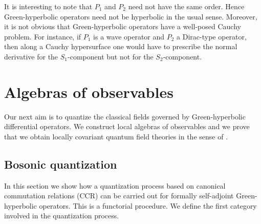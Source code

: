 \documentclass[a4paper,11pt]{amsart}
\theoremstyle{definition}
\begin{document}
It is interesting to note that $P_1$ and $P_2$ need not have the same order.
Hence Green-hyperbolic operators need not be hyperbolic in the usual sense.
Moreover, it is not obvious that Green-hyperbolic operators have a well-posed Cauchy problem.
For instance, if $P_1$ is a wave operator and $P_2$ a Dirac-type operator, then along a Cauchy hypersurface one would have to prescribe the normal derivative for the $S_1$-component but not for the $S_2$-component.

\section{Algebras of observables}

Our next aim is to quantize the classical fields governed by Green-hyperbolic differential operators.
We construct local algebras of observables and we prove that we obtain locally covariant quantum field theories in the sense of \cite{BFV}.

\subsection{Bosonic quantization}\label{ss:CCRquant}

In this section we show how a quantization process based on canonical commutation relations (CCR) can be carried out for formally self-adjoint Green-hyperbolic operators.
This is a functorial procedure.
We define the first category involved in the quantization process.
\end{document}
